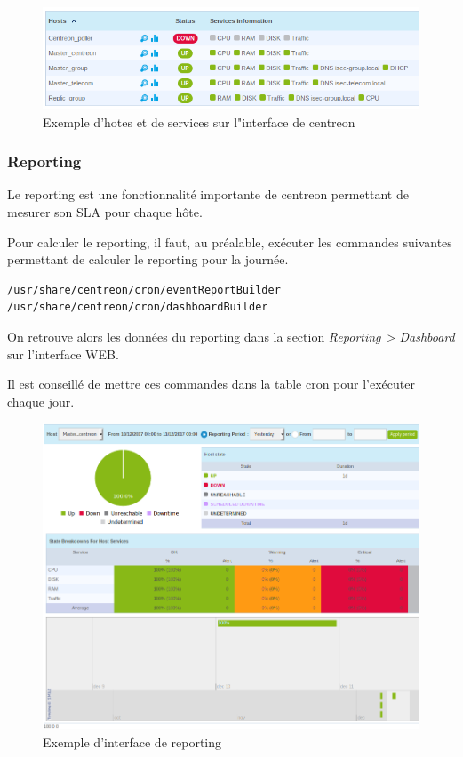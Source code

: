 		\begin{figure}[h]
			\centering
			\includegraphics[scale=0.5]{Supervision/service-grid.png}
			\caption{Exemple d'hotes et de services sur l"interface de centreon}
		\end{figure}

		\subsubsection{Reporting}

		Le reporting est une fonctionnalité importante de centreon permettant de mesurer son SLA pour chaque hôte.

		Pour calculer le reporting, il faut, au préalable, exécuter les commandes suivantes permettant de calculer le reporting pour la journée.

		\begin{lstlisting}[caption=Commandes permettant de calculer le reporting pour la journée en cours]
/usr/share/centreon/cron/eventReportBuilder
/usr/share/centreon/cron/dashboardBuilder
		\end{lstlisting}

		On retrouve alors les données du reporting dans la section \emph{Reporting > Dashboard} sur l'interface WEB.

		Il est conseillé de mettre ces commandes dans la table cron pour l'exécuter chaque jour.

		\begin{figure}[h]
			\centering
			\includegraphics[scale=0.5]{Supervision/monitoring.png}
			\caption{Exemple d'interface de reporting}
		\end{figure}

